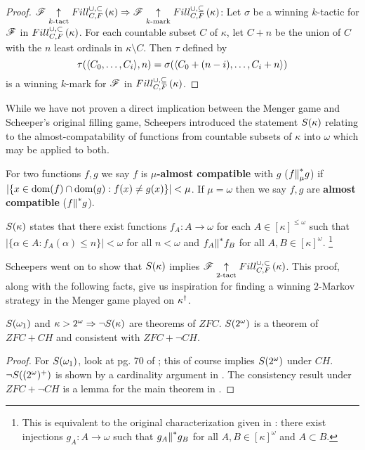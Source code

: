 \begin{proof}
  $\mathscr{F} \underset{k\text{-tact}}{\uparrow}Fill^{\cup,\subset}_{C,F}\left({\kappa}\right)
    \Rightarrow
  \mathscr{F} \underset{k\text{-mark}}{\uparrow}Fill^{\cup,\subseteq}_{C,F}\left({\kappa}\right)$:
  Let $\sigma$ be a winning $k$-tactic for $\mathscr{F}$ in
  $Fill^{\cup,\subset}_{C,F}\left({\kappa}\right)$. For each countable subset $C$ of $\kappa$, let $C+n$
  be the union of $C$ with the $n$ least ordinals in $\kappa\setminus C$.
  Then $\tau$ defined by
    \[
      \tau(\langle C_0,\dots,C_i\rangle,n)
        =
      \sigma(\langle C_0+(n-i),\dots,C_i+n\rangle)
    \]
  is a winning $k$-mark for $\mathscr{F}$ in $Fill^{\cup,\subseteq}_{C,F}\left({\kappa}\right)$.
\end{proof}

While we have not proven a direct implication between the Menger game and
Scheeper's original filling game, Scheepers introduced the statement
$S(\kappa)$ relating to the almost-compatability of functions
from countable subsets of $\kappa$ into $\omega$ which may be applied to
both.

\begin{defn}
  For two functions $f,g$ we say $f$ is \textbf{$\mu$-almost compatible} with
  $g$ ($f{\parallel}^*_\mu g$) if $|\{x\in\textrm{dom}(f)\cap\textrm{dom}(g):f(x)\not=g(x)\}|<\mu$.
  If $\mu=\omega$ then we say $f,g$ are \textbf{almost compatible}
  ($f{\parallel}^* g$).
\end{defn}

\begin{defn}
  $S(\kappa)$ states that there exist functions
  $f_A:A\to\omega$ for each $A\in[\kappa]^{\leq\omega}$ such that
  $|\{\alpha\in A:f_A(\alpha)\leq n\}|<\omega$ for all $n<\omega$ and
  $f_A{\parallel}^* f_B$ for all $A,B\in[\kappa]^\omega$.
  \footnote{
  This is equivalent to the original characterization given in
  \cite{MR1129143}: there exist injections $g_A:A\to\omega$
  such that $g_A{\parallel}^* g_B$ for all $A,B\in[\kappa]^\omega$ and $A\subset B$.
  }
\end{defn}

Scheepers went on to show that $S(\kappa)$ implies
$\mathscr{F} \underset{2\text{-tact}}{\uparrow} Fill^{\cup,\subset}_{C,F}\left({\kappa}\right)$. This proof, along with the following
facts, give us inspiration for
finding a winning $2$-Markov strategy in the Menger game played on
$\kappa^\dagger$.

\begin{thm}
  $S(\omega_1)$ and $\kappa>2^\omega\Rightarrow\neg S(\kappa)$
  are theorems of $ZFC$.
  $S(2^\omega)$ is a theorem of $ZFC+CH$ and consistent with
  $ZFC+\neg CH$.
\end{thm}

\begin{proof}
  For $S(\omega_1)$, look at pg. 70 of \cite{MR597342}; this of course
  implies $S(2^\omega)$ under $CH$.
  $\neg S((2^\omega)^+)$ is shown by a cardinality argument
  in \cite{MR1129143}.
  The consistency result under $ZFC+\neg CH$
  is a lemma for the main theorem in \cite{MR1129143}.
\end{proof}

